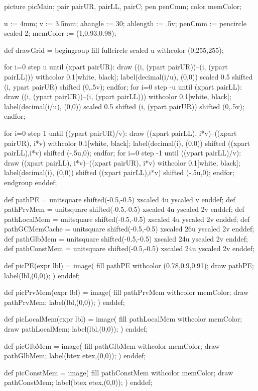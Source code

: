 
picture picMain;
pair pairUR, pairLL, pairC;
pen penCmm;
color memColor;

u := 4mm;
v := 3.5mm;
ahangle := 30;
ahlength := .5v;
penCmm := pencircle scaled 2;
memColor := (1,0.93,0.98);

def drawGrid =
begingroup
fill fullcircle scaled u withcolor (0,255,255);

for i=0 step u until (xpart pairUR):
	draw ((i, (ypart pairUR))--(i, (ypart pairLL))) withcolor 0.1[white, black];
	label(decimal(i/u), (0,0)) scaled 0.5 shifted (i, ypart pairUR) shifted (0,.5v);
endfor;
for i=0 step -u until (xpart pairLL):
	draw ((i, (ypart pairUR))--(i, (ypart pairLL)))  withcolor 0.1[white, black];
	label(decimal(i/u), (0,0)) scaled 0.5  shifted (i, (ypart pairUR)) shifted (0,.5v);
endfor;

for i=0 step 1 until ((ypart pairUR)/v):
	draw ((xpart pairLL), i*v)--((xpart pairUR), i*v) withcolor 0.1[white, black];
	label(decimal(i), (0,0)) shifted ((xpart pairLL),i*v) shifted (-.5u,0);
endfor;
for i=0 step -1 until ((ypart pairLL)/v):
	draw ((xpart pairLL), i*v)--((xpart pairUR), i*v) withcolor 0.1[white, black];
	label(decimal(i), (0,0)) shifted ((xpart pairLL),i*v) shifted (-.5u,0);
endfor;
endgroup
enddef;

def pathPE =
unitsquare shifted(-0.5,-0.5) xscaled 4u yscaled v
enddef;
def pathPrvMem =
unitsquare shifted(-0.5,-0.5) xscaled 4u yscaled 2v
enddef;
def pathLocalMem =
unitsquare shifted(-0.5,-0.5) xscaled 4u yscaled 2v
enddef;
def pathGCMemCache =
unitsquare shifted(-0.5,-0.5) xscaled 26u yscaled 2v
enddef;
def pathGlbMem =
unitsquare shifted(-0.5,-0.5) xscaled 24u yscaled 2v
enddef;
def pathConstMem =
unitsquare shifted(-0.5,-0.5) xscaled 24u yscaled 2v
enddef;

def picPE(expr lbl) =
image(
fill pathPE withcolor (0.78,0.9,0.91);
draw pathPE;
label(lbl,(0,0));
)
enddef;

def picPrvMem(expr lbl) =
image(
fill pathPrvMem withcolor memColor;
draw pathPrvMem;
label(lbl,(0,0));
)
enddef;

def picLocalMem(expr lbl) =
image(
fill pathLocalMem withcolor memColor;
draw pathLocalMem;
label(lbl,(0,0));
)
enddef;

def picGlbMem =
image(
fill pathGlbMem withcolor memColor;
draw pathGlbMem;
label(btex  etex,(0,0));
)
enddef;

def picConstMem =
image(
fill pathConstMem withcolor memColor;
draw pathConstMem;
label(btex  etex,(0,0));
)
enddef;

